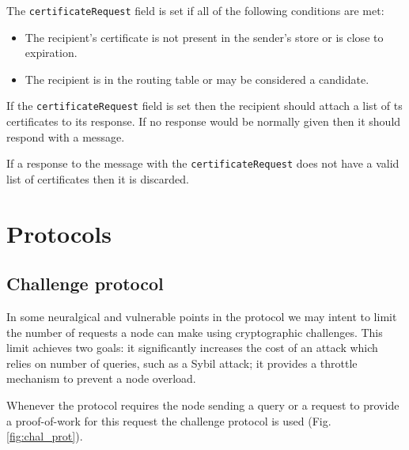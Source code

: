 The \texttt{certificateRequest} field is set if all of the following conditions
are met:

\begin{itemize}
  \item The recipient's certificate is not present in the sender's store or is
    close to expiration.
  \item The recipient is in the routing table or may be considered a candidate.
\end{itemize}

If the \texttt{certificateRequest} field is set then the recipient should attach
a list of ts certificates to its response. If no response would be normally
given then it should respond with a  message.

If a response to the message with the \texttt{certificateRequest} does not have
a valid list of certificates then it is discarded.

\section{Protocols}
\label{sec:ghoul_protocols}
\subsection{Challenge protocol}
In some neuralgical and vulnerable points in the protocol we may intent to limit
the number of requests a node can make using cryptographic challenges. This
limit achieves two goals: it significantly increases the cost of an attack which
relies on number of queries, such as a Sybil attack; it provides a throttle
mechanism to prevent a node overload.

Whenever the protocol requires the node sending a query or a request to provide
a proof-of-work for this request the challenge protocol is used
(Fig. \ref{fig:chal_prot}).

